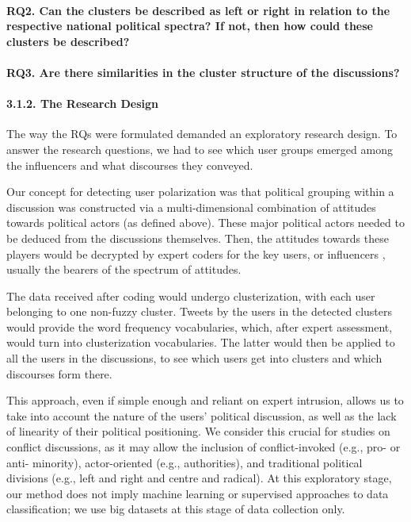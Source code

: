 \paragraph{RQ2. Can the clusters be described as left or right in relation to the respective national political spectra? If not, then how could these clusters be described?}

\paragraph{RQ3. Are there similarities in the cluster structure of the discussions?}

\paragraph{3.1.2. The Research Design}

The way the RQs were formulated demanded an exploratory research design. To answer the research questions, we had to see which user groups emerged among the influencers and what discourses they conveyed.

Our concept for detecting user polarization was that political grouping within a discussion was constructed via a multi-dimensional combination of attitudes towards political actors (as defined above). These major political actors needed to be deduced from the discussions themselves. Then, the attitudes towards these players would be decrypted by expert coders for the key users, or influencers \cite{BodrunovaBlekanovMaksimov}, usually the bearers of the spectrum of attitudes.

The data received after coding would undergo clusterization, with each user belonging to one non-fuzzy cluster. Tweets by the users in the detected clusters would provide the word frequency vocabularies, which, after expert assessment, would turn into clusterization vocabularies. The latter would then be applied to all the users in the discussions, to see which users get into clusters and which discourses form there.

This approach, even if simple enough and reliant on expert intrusion, allows us to take into account the nature of the users’ political discussion, as well as the lack of linearity of their political positioning. We consider this crucial for studies on conflict discussions, as it may allow the inclusion of conflict-invoked (e.g., pro- or anti- minority), actor-oriented (e.g., authorities), and traditional political divisions (e.g., left and right and centre and radical). At this exploratory stage, our method does not imply machine learning or supervised approaches to data classification; we use big datasets at this stage of data collection only.

